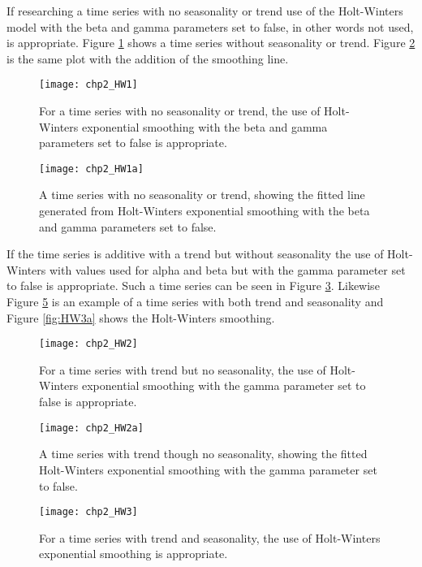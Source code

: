 If researching a time series with no seasonality or trend use of the Holt-Winters model with the beta and gamma parameters set to false, in other words not used, is appropriate. Figure \ref{fig:HW1} shows a time series without seasonality or trend. Figure \ref{fig:HW1a} is the same plot with the addition of the smoothing line.

\begin{figure}[tbph!]
\centering
\texttt{[image: chp2\_HW1]}
\caption[A time series with no seasonality or trend]{For a time series with no seasonality or trend, the use of Holt-Winters exponential smoothing with the beta and gamma parameters set to false is appropriate.}
\label{fig:HW1}
\end{figure}

\begin{figure}[tbph!]
\centering
\texttt{[image: chp2\_HW1a]}
\caption[A time series with no seasonality or trend plus exponential smoothing]{A time series with no seasonality or trend, showing the fitted line generated from Holt-Winters exponential smoothing with the beta and gamma parameters set to false.}
\label{fig:HW1a}
\end{figure}

If the time series is additive with a trend but without seasonality the use of Holt-Winters with values used for alpha and beta but with the gamma parameter set to false is appropriate. Such a time series can be seen in Figure \ref{fig:HW2}. Likewise Figure \ref{fig:HW3} is an example of a time series with both trend and seasonality and Figure \ref{fig:HW3a} shows the Holt-Winters smoothing.

\begin{figure}[tbph!]
\centering
\texttt{[image: chp2\_HW2]}
\caption[A time series with trend though no seasonality]{For a time series with trend but no seasonality, the use of Holt-Winters exponential smoothing with the gamma parameter set to false is appropriate.}
\label{fig:HW2}
\end{figure}

\begin{figure}[tbph!]
\centering
\texttt{[image: chp2\_HW2a]}
\caption[A time series with trend though no seasonality plus exponential smoothing.]{A time series with trend though no seasonality, showing the fitted Holt-Winters exponential smoothing with the gamma parameter set to false.}
\label{fig:HW2a}
\end{figure}

\begin{figure}[tbph!]
\centering
\texttt{[image: chp2\_HW3]}
\caption[A time series with trend and seasonality]{For a time series with trend and seasonality, the use of Holt-Winters exponential smoothing is appropriate.}
\label{fig:HW3}
\end{figure}

